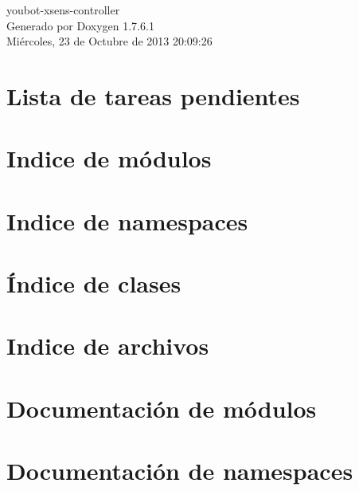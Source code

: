 \documentclass[a4paper]{book}
\begin{document}
\hypersetup{pageanchor=false,citecolor=blue}
\begin{titlepage}
\vspace*{7cm}
\begin{center}
{\Large youbot-\/xsens-\/controller }\\
\vspace*{1cm}
{\large \-Generado por Doxygen 1.7.6.1}\\
\vspace*{0.5cm}
{\small Miércoles, 23 de Octubre de 2013 20:09:26}\\
\end{center}
\end{titlepage}
\clearemptydoublepage
{}
\tableofcontents
\clearemptydoublepage
{}
\hypersetup{pageanchor=true,citecolor=blue}
\chapter{\-Lista de tareas pendientes}
\label{todo}
\hypertarget{todo}{}

\chapter{\-Indice de módulos}

\chapter{\-Indice de namespaces}

\chapter{Índice de clases}

\chapter{\-Indice de archivos}

\chapter{\-Documentación de módulos}

\chapter{\-Documentación de namespaces}


\end{document}
